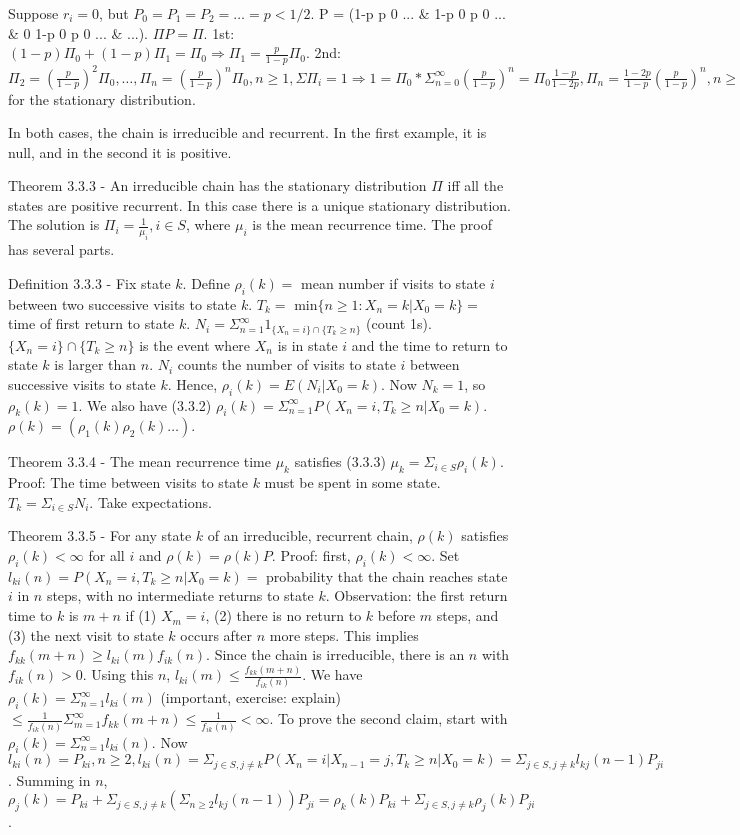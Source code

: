 \documentclass{article}
\begin{document}
Suppose $r_i = 0$, but $P_0 = P_1 = P_2 = \dots = p < 1/2$. P = (1-p p 0 ... \& 1-p 0 p 0 ... \& 0 1-p 0 p 0 ... \& ...). $\Pi P = \Pi$. 1st: $(1-p)\Pi_0 + (1-p)\Pi_1 = \Pi_0 \Rightarrow \Pi_1 = \frac{p}{1-p} \Pi_0$. 2nd: $\Pi_2 = (\frac{p}{1-p})^2 \Pi_0, \dots, \Pi_n = (\frac{p}{1-p})^n \Pi_0, n \ge 1, \Sigma \Pi_i = 1 \Rightarrow 1 = \Pi_0 * \Sigma_{n=0}^\infty (\frac{p}{1-p})^n = \Pi_0 \frac{1-p}{1-2p}, \Pi_n = \frac{1-2p}{1-p} (\frac{p}{1-p})^n, n \ge 0$ for the stationary distribution.

In both cases, the chain is irreducible and recurrent. In the first example, it is null, and in the second it is positive.

Theorem 3.3.3 - An irreducible chain has the stationary distribution $\Pi$ iff all the states are positive recurrent. In this case there is a unique stationary distribution. The solution is $\Pi_i = \frac{1}{\mu_i}, i \in S$, where $\mu_i$ is the mean recurrence time. The proof has several parts.

Definition 3.3.3 - Fix state $k$. Define $\rho_i(k) =$ mean number if visits to state $i$ between two successive visits to state $k$. $T_k =$ min$\{n \ge 1: X_n=k | X_0=k\} =$ time of first return to state $k$. $N_i = \Sigma_{n=1}^\infty 1_{\{X_n=i\} \cap \{T_k \ge n\}}$ (count 1s). $\{X_n=i\} \cap \{T_k \ge n\}$ is the event where $X_n$ is in state $i$ and the time to return to state $k$ is larger than $n$. $N_i$ counts the number of visits to state $i$ between successive visits to state $k$. Hence, $\rho_i(k) = E(N_i|X_0=k)$. Now $N_k = 1$, so $\rho_k(k) = 1$. We also have (3.3.2) $\rho_i(k) = \Sigma_{n=1}^\infty P(X_n=i, T_k \ge n|X_0=k)$. $\rho(k) = (\rho_1(k) \rho_2(k) \dots)$.

Theorem 3.3.4 - The mean recurrence time $\mu_k$ satisfies (3.3.3) $\mu_k = \Sigma_{i \in S} \rho_i(k)$. Proof: The time between visits to state $k$ must be spent in some state. $T_k = \Sigma_{i \in S} N_i$. Take expectations.

Theorem 3.3.5 - For any state $k$ of an irreducible, recurrent chain, $\rho(k)$ satisfies $\rho_i(k) < \infty$ for all $i$ and $\rho(k) = \rho(k) P$. Proof: first, $\rho_i(k) < \infty$. Set $l_{ki}(n) = P(X_n=i, T_k \ge n|X_0=k) =$ probability that the chain reaches state $i$ in $n$ steps, with no intermediate returns to state $k$. Observation: the first return time to $k$ is $m + n$ if (1) $X_m = i$, (2) there is no return to $k$ before $m$ steps, and (3) the next visit to state $k$ occurs after $n$ more steps. This implies $f_{kk}(m+n) \ge l_{ki}(m) f_{ik}(n)$. Since the chain is irreducible, there is an $n$ with $f_{ik}(n) > 0$. Using this $n$, $l_{ki}(m) \le \frac{f_{kk}(m+n)}{f_{ik}(n)}$. We have $\rho_i(k) = \Sigma_{n=1}^\infty l_{ki}(m)$ (important, exercise: explain) $\le \frac{1}{f_{ik}(n)} \Sigma_{m=1}^\infty f_{kk}(m+n) \le \frac{1}{f_{ik}(n)} < \infty$. To prove the second claim, start with $\rho_i(k) = \Sigma_{n=1}^\infty l_{ki}(n)$. Now $l_{ki}(n) = P_{ki}, n \ge 2, l_{ki}(n) = \Sigma_{j \in S, j \ne k} P(X_n=i|X_{n-1}=j, T_k \ge n|X_0=k) = \Sigma_{j \in S, j \ne k} l_{kj}(n-1)P_{ji}$. Summing in $n$, $\rho_j(k) = P_{ki} + \Sigma_{j \in S, j \ne k} (\Sigma_{n \ge 2} l_{kj}(n-1)) P_{ji} = \rho_k(k) P_{ki} + \Sigma_{j \in S, j \ne k} \rho_j(k) P_{ji}$.
\end{document}
